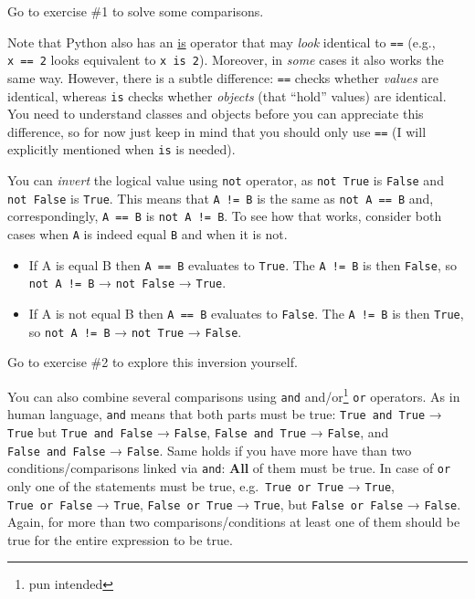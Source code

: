 \documentclass[
]{book}
\providecommand{\tightlist}{%
  \setlength{\itemsep}{0pt}\setlength{\parskip}{0pt}}
\begin{document}
Go to exercise \#1 to solve some comparisons.

Note that Python also has an \href{https://docs.python.org/3/library/operator.html\#operator.is_}{is} operator that may \emph{look} identical to \texttt{==} (e.g., \texttt{x\ ==\ 2} looks equivalent to \texttt{x\ is\ 2}). Moreover, in \emph{some} cases it also works the same way. However, there is a subtle difference: \texttt{==} checks whether \emph{values} are identical, whereas \texttt{is} checks whether \emph{objects} (that ``hold'' values) are identical. You need to understand classes and objects before you can appreciate this difference, so for now just keep in mind that you should only use \texttt{==} (I will explicitly mentioned when \texttt{is} is needed).

You can \emph{invert} the logical value using \texttt{not} operator, as \texttt{not\ True} is \texttt{False} and \texttt{not\ False} is \texttt{True}. This means that \texttt{A\ !=\ B} is the same as \texttt{not\ A\ ==\ B} and, correspondingly, \texttt{A\ ==\ B} is \texttt{not\ A\ !=\ B}. To see how that works, consider both cases when \texttt{A} is indeed equal \texttt{B} and when it is not.

\begin{itemize}
\tightlist
\item
  If A is equal B then \texttt{A\ ==\ B} evaluates to \texttt{True}. The \texttt{A\ !=\ B} is then \texttt{False}, so \texttt{not\ A\ !=\ B} → \texttt{not\ False} → \texttt{True}.
\item
  If A is not equal B then \texttt{A\ ==\ B} evaluates to \texttt{False}. The \texttt{A\ !=\ B} is then \texttt{True}, so \texttt{not\ A\ !=\ B} → \texttt{not\ True} → \texttt{False}.
\end{itemize}

Go to exercise \#2 to explore this inversion yourself.

You can also combine several comparisons using \texttt{and} and/or\footnote{pun intended} \texttt{or} operators. As in human language, \texttt{and} means that both parts must be true: \texttt{True\ and\ True} → \texttt{True} but \texttt{True\ and\ False} → \texttt{False}, \texttt{False\ and\ True} → \texttt{False}, and \texttt{False\ and\ False} → \texttt{False}. Same holds if you have more have than two conditions/comparisons linked via \texttt{and}: \textbf{All} of them must be true. In case of \texttt{or} only one of the statements must be true, e.g.~\texttt{True\ or\ True} → \texttt{True}, \texttt{True\ or\ False} → \texttt{True}, \texttt{False\ or\ True} → \texttt{True}, but \texttt{False\ or\ False} → \texttt{False}. Again, for more than two comparisons/conditions at least one of them should be true for the entire expression to be true.
\end{document}
